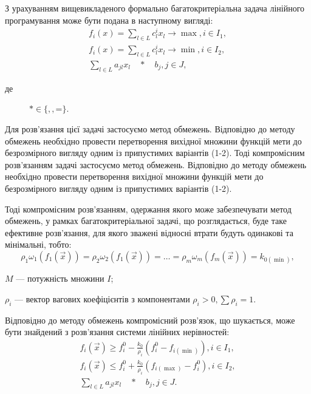 З урахуванням вищевикладеного формально багатокритеріальна задача лінійного програмування може бути подана в наступному вигляді:
\begin{gather*}
	f_i(x) = \sum_{l \in L}{c_l^i x_l} \to \max, i \in I_1, \\
	f_i(x) = \sum_{l \in L}{c_l^i x_l} \to \min, i \in I_2, \\
	\sum_{l \in L}{a_{jl} x_l \quad * \quad b_j}, j \in J,
\end{gather*}
\begin{description}
	\item[де] $* \in \{$\leq$, $\geq$, $=$\}$.
\end{description}

Для розв'язання цієї задачі застосуємо метод обмежень. 
Відповідно до методу обмежень необхідно провести перетворення вихідної множини функцій мети до безрозмірного вигляду одним із припустимих варіантів (1-2). 
Тоді компромісним розв'язанням задачі застосуємо метод обмежень. 
Відповідно до методу обмежень необхідно провести перетворення вихідної множини функцій мети до безрозмірного вигляду одним із припустимих варіантів (1-2). 

Тоді компромісним розв'язанням, одержання якого може забезпечувати метод обмежень, у рамках багатокритеріальної задачі, що розглядається, буде таке ефективне розв'язання, для якого зважені відносні втрати будуть одинакові та мінімальні, тобто:
\[
\rho_1 \omega_1 (f_1(\vec{x})) = \rho_2 \omega_2 (f_1(\vec{x})) = \ldots = \rho_m \omega_m (f_m(\vec{x})) = k_{0 (\min)},
\]
\begin{description}
	\item[де] $M$ --- потужність множини $I$; 
	\item $\rho_i$ --- вектор вагових коефіцієнтів з компонентами $\rho_i > 0, \sum{\rho_i} = 1$.
\end{description}

Відповідно до методу обмежень компромісний розв'язок, що шукається, може бути знайдений з розв'язання системи лінійних нерівностей:
\begin{gather*}
	f_i(\vec{x}) \geq f_{i}^0 - \frac{k_0}{\rho_i}(f_{i}^0 - f_{i(\min)}) , i \in I_1, \\
	f_i(\vec{x}) \leq f_{i}^0 + \frac{k_0}{\rho_i}(f_{i(\max)} - f_{i}^0 ), i \in I_2, \\
	\sum_{l \in L}{a_{jl} x_l \quad * \quad b_j}, j \in J.
\end{gather*}

